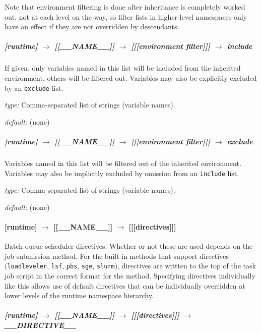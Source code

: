Note that environment filtering is done after inheritance is completely
worked out, not at each level on the way, so filter lists in higher-level
namespaces only have an effect if they are not overridden by descendants.

\subparagraph[include]{[runtime] $\rightarrow$ [[\_\_NAME\_\_]] $\rightarrow$ [[[environment filter]]] $\rightarrow$ include}

If given, only variables named in this list will be included from the
inherited environment, others will be filtered out. Variables may also
be explicitly excluded by an \lstinline=exclude= list.

\begin{myitemize}
\item {\em type:} Comma-separated list of strings (variable names).
\item {\em default:} (none)
\end{myitemize}

\subparagraph[exclude]{[runtime] $\rightarrow$ [[\_\_NAME\_\_]] $\rightarrow$ [[[environment filter]]] $\rightarrow$ exclude}

Variables named in this list will be filtered out of the inherited
environment.  Variables may also be implicitly excluded by
omission from an \lstinline=include= list.

\begin{myitemize}
\item {\em type:} Comma-separated list of strings (variable names).
\item {\em default:} (none)
\end{myitemize}

\paragraph[{[[[}directives{]]]}]{[runtime] $\rightarrow$ [[\_\_NAME\_\_]] $\rightarrow$ [[[directives]]]}

Batch queue scheduler directives.  Whether or not these are used depends
on the job submission method. For the built-in methods that support directives
(\lstinline=loadleveler=, \lstinline=lsf=, \lstinline=pbs=, \lstinline=sge=,
\lstinline=slurm=), directives are written to the top of the task job script
in the correct format for the method. Specifying directives individually like
this allows use of default directives that can be individually overridden at
lower levels of the runtime namespace hierarchy.

\subparagraph[\_\_DIRECTIVE\_\_ ]{[runtime] $\rightarrow$ [[\_\_NAME\_\_]] $\rightarrow$ [[[directives]]] $\rightarrow$ \_\_DIRECTIVE\_\_}


